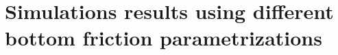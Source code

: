 \documentclass[12pt]{article}
\begin{document}





\section{Simulations results using different bottom friction parametrizations}
\end{document}
